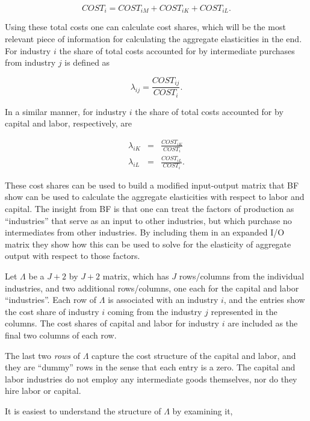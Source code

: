 \documentclass[11pt]{article}
\begin{document}
\begin{equation}
	COST_i = COST_{iM} + COST_{iK} + COST_{iL}.
\end{equation}

Using these total costs one can calculate cost shares, which will be the most relevant piece of information for calculating the aggregate elasticities in the end. For industry $i$ the share of total costs accounted for by intermediate purchases from industry $j$ is defined as

\begin{equation}
	\lambda_{ij} = \frac{COST_{ij}}{COST_i}.
\end{equation}

In a similar manner, for industry $i$ the share of total costs accounted for by capital and labor, respectively, are

\begin{eqnarray}
	\lambda_{iK} &=& \frac{COST_{iK}}{COST_i} \\
	\lambda_{iL} &=& \frac{COST_{iL}}{COST_i}.
\end{eqnarray}

These cost shares can be used to build a modified input-output matrix that BF show can be used to calculate the aggregate elasticities with respect to labor and capital. The insight from BF is that one can treat the factors of production as ``industries'' that serve as an input to other industries, but which purchase no intermediates from other industries. By including them in an expanded I/O matrix they show how this can be used to solve for the elasticity of aggregate output with respect to those factors. 

Let $\Lambda$ be a $J+2$ by $J+2$ matrix, which has $J$ rows/columns from the individual industries, and two additional rows/columns, one each for the capital and labor ``industries''. Each row of $\Lambda$ is associated with an industry $i$, and the entries show the cost share of industry $i$ coming from the industry $j$ represented in the columns. The cost shares of capital and labor for industry $i$ are included as the final two columns of each row. 

The last two \textit{rows} of $\Lambda$ capture the cost structure of the capital and labor, and they are ``dummy'' rows in the sense that each entry is a zero. The capital and labor industries do not employ any intermediate goods themselves, nor do they hire labor or capital.

It is easiest to understand the structure of $\Lambda$ by examining it,
\end{document}
